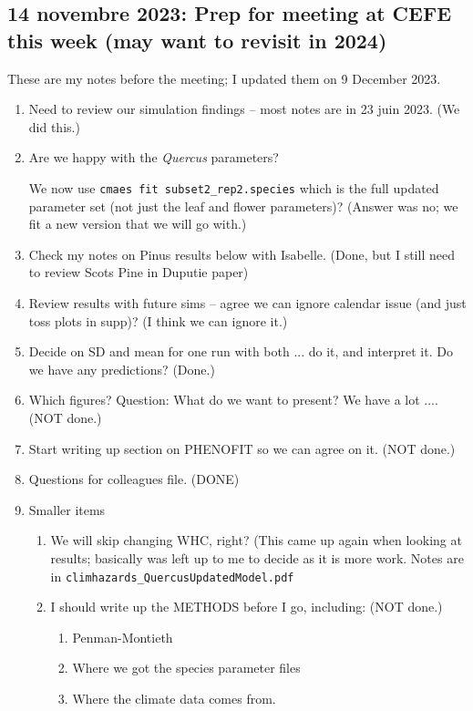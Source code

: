\documentclass[11pt,letter]{article}
\begin{document}
\subsection{14 novembre 2023: Prep for meeting at CEFE this week (may want to revisit in 2024)}
These are my notes before the meeting; I updated them on 9 December 2023. 

\begin{enumerate}
\item Need to review our simulation findings -- most notes are in 23 juin 2023. (We did this.)
\item Are we happy with the \emph{Quercus} parameters? 

We now use \verb|cmaes fit subset2_rep2.species| which is the full updated parameter set (not just the leaf and flower parameters)? (Answer was no; we fit a new version that we will go with.)
\item Check my notes on Pinus results below with Isabelle. (Done, but I still need to review Scots Pine in Duputie paper)
\item Review results with future sims -- agree we can ignore calendar issue (and just toss plots in supp)? (I think we can ignore it.)
\item Decide on SD and mean for one run with both ... do it, and interpret it. Do we have any predictions? (Done.)
\item Which figures? Question: What do we want to present? We have a lot .... (NOT done.)
\item Start writing up section on PHENOFIT so we can agree on it.  (NOT done.)
\item Questions for colleagues file. (DONE)
\item Smaller items
\begin{enumerate}
\item We will skip changing WHC, right? (This came up again when looking at results; basically was left up to me to decide as it is more work. Notes are in \verb|climhazards_QuercusUpdatedModel.pdf|
\item I should write up the METHODS before I go, including: (NOT done.)
\begin{enumerate}
\item Penman-Montieth
\item Where we got the species parameter files
\item Where the climate data comes from.
\end{enumerate}
\end{enumerate}
\end{enumerate}
\end{document}
